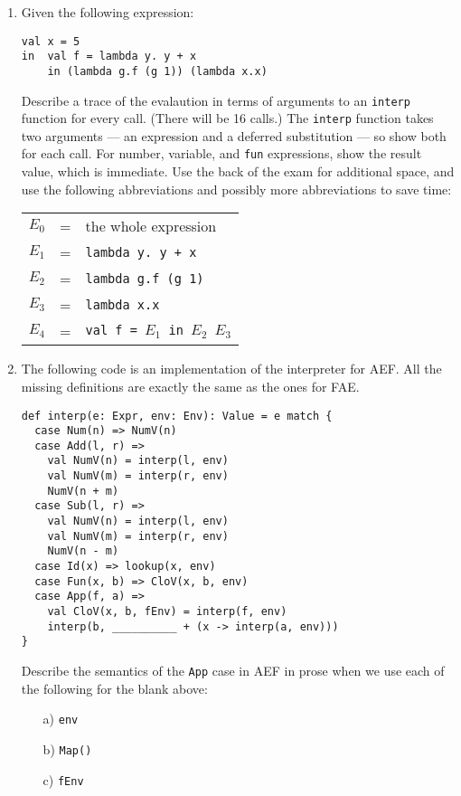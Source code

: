 \begin{enumerate}
\item Given the following expression:

\begin{verbatim}
val x = 5
in  val f = lambda y. y + x
    in (lambda g.f (g 1)) (lambda x.x)
\end{verbatim}

Describe a trace of the evalaution in terms of arguments to an \texttt{interp}
function for every call. (There will be 16 calls.) The \texttt{interp} function
takes two arguments --- an expression and a
   deferred substitution --- so show both for each call.  For number,
   variable, and \texttt{fun} expressions, show the result value, which
   is immediate. Use the back of the exam for additional space, and
   use the following abbreviations and possibly more abbreviations
 to save time:

\begin{center}
\begin{tabular}{lcl}
$E_0$ & = & the whole expression \\
$E_1$ & = & \texttt{lambda y. y + x} \\
$E_2$ & = & \texttt{lambda g.f (g 1)} \\
$E_3$ & = & \texttt{lambda x.x} \\
$E_4$ & = & \texttt{val f = $E_1$ in $E_2$ $E_3$}
\end{tabular}
\end{center}

\item The following code is an implementation of the interpreter for AEF.
All the missing definitions are exactly the same as the ones for FAE.

\begin{verbatim}
def interp(e: Expr, env: Env): Value = e match {
  case Num(n) => NumV(n)
  case Add(l, r) =>
    val NumV(n) = interp(l, env)
    val NumV(m) = interp(r, env)
    NumV(n + m)
  case Sub(l, r) =>
    val NumV(n) = interp(l, env)
    val NumV(m) = interp(r, env)
    NumV(n - m)
  case Id(x) => lookup(x, env)
  case Fun(x, b) => CloV(x, b, env)
  case App(f, a) =>
    val CloV(x, b, fEnv) = interp(f, env)
    interp(b, __________ + (x -> interp(a, env)))
}
\end{verbatim}

Describe the semantics of the \texttt{App} case in AEF in prose
when we use each of the following for the blank above:
\begin{itemize}
  \item[a)] \texttt{env}
  \item[b)] \texttt{Map()}
  \item[c)] \texttt{fEnv}
\end{itemize}


\end{enumerate}
